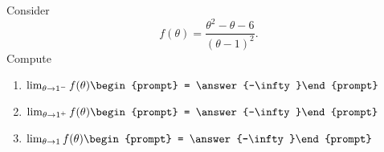 \documentclass{ximera}
\author{Bart Snapp}
\begin{document}
\begin{exercise}
Consider 
\[
f(\theta) = \frac{\theta ^2-\theta -6}{(\theta -1)^2}.
\]
Compute
\begin{enumerate}
\item $\lim_{\theta\to 1^- } f(\theta) \begin{prompt} = \answer{-\infty}\end{prompt}$
\item $\lim_{\theta\to 1^+ } f(\theta) \begin{prompt} = \answer{-\infty}\end{prompt}$
\item $\lim_{\theta\to 1 } f(\theta) \begin{prompt} = \answer{-\infty}\end{prompt}$
\end{enumerate}
\end{exercise}
\end{document}

